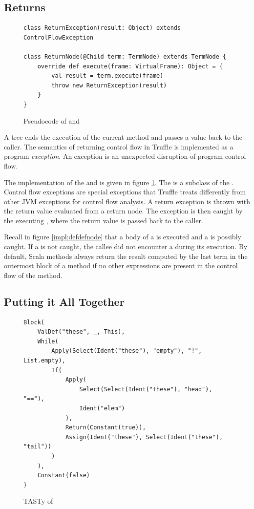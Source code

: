 \subsection{Returns}

\begin{figure}[!htb]
\begin{verbatim}
class ReturnException(result: Object) extends ControlFlowException

class ReturnNode(@Child term: TermNode) extends TermNode {
	override def execute(frame: VirtualFrame): Object = { 
		val result = term.execute(frame)
		throw new ReturnException(result)
	}
}
\end{verbatim}
\caption{Pseudocode of  and }
\label{impl:return}
\end{figure}

A  tree ends the execution of the current method and passes a value back to the caller.
The semantics of returning control flow in Truffle is implemented as a program \textit{exception}.
An exception is an unexpected disruption of program control flow.

The implementation of the  and  is given in figure \ref{impl:return}.
The  is a subclass of the . 
Control flow exceptions are special exceptions that Truffle treats differently from other JVM exceptions for control flow analysis.
A return exception is thrown with the return value evaluated from a return node.
The exception is then caught by the executing , where the return value is passed back to the caller. 

Recall in figure \ref{impl:defdefnode} that a body of a  is executed and a  is possibly caught.
If a  is not caught, the callee did not encounter a  during its execution.
By default, Scala methods always return the result computed by the last term in the outermost block of a method if no other  expressions are present in the control flow of the method. 

\subsection{Putting it All Together}

\begin{figure}[!htb]
\begin{verbatim}
Block(
	ValDef("these", _, This),			
	While(
		Apply(Select(Ident("these"), "empty"), "!", List.empty),
		If(
			Apply(
				Select(Select(Ident("these"), "head"), "=="), 
				Ident("elem")
			),
			Return(Constant(true)),
			Assign(Ident("these"), Select(Ident("these"), "tail"))
		)	
	),
	Constant(false)
)
\end{verbatim}
\caption{TASTy of }
\label{tasty:list-contains}
\end{figure}

